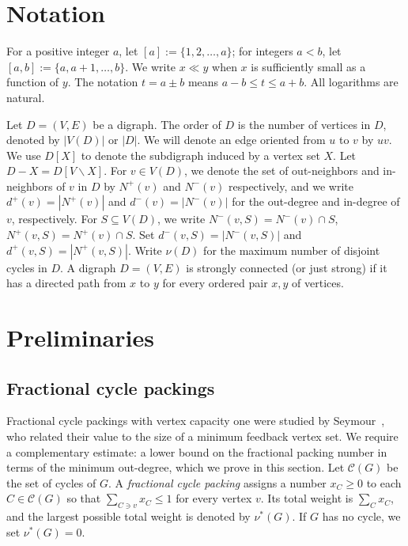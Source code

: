 \documentclass[10pt,a4paper]{article}
\numberwithin{equation}{section}
\begin{document}
\section{Notation}\label{sec:notation}


For a positive integer $a$, let $[a]:=\{1,2,\ldots,a\}$; for integers $a<b$, let $[a,b]:=\{a,a+1,\ldots,b\}$. We write $x\ll y$ when $x$ is sufficiently small as a function of $y$. The notation $t=a\pm b$ means $a-b\leq t\leq a+b$. All logarithms are natural.


Let $D=(V,E)$ be a digraph.  The order of $D$ is the number of vertices in $D$,  denoted by $|V(D)|$ or $|D|$.  We will denote an edge oriented from $u$ to $v$ by $uv$. We use $D[X]$ to denote the subdigraph induced by a vertex set $X$. Let $D-X = D[V\backslash X]$.  For $v\in V(D)$, we denote the set of out-neighbors and in-neighbors of $v$ in $D$ by $N^+(v)$ and $N^-(v)$ respectively, and we write $d^+(v)=|N^+(v)|$ and $d^-(v)=|N^-(v)|$ for the out-degree and in-degree of $v$, respectively. For $S\subseteq V(D)$, we write $N^-(v,S)=N^-(v)\cap S$, $N^+(v,S)=N^+(v)\cap S$. Set $d^-(v,S)=|N^-(v,S)|$ and $d^+(v,S)=|N^+(v, S)|$.   %
Write $\nu(D)$ for the maximum number of disjoint cycles
in $D$. A digraph $D=(V,E)$ is strongly connected (or just strong) if it has a directed path from $x$ to $y$ for every ordered pair $x,y$ of vertices.


\section{Preliminaries}\label{sec:preliminaries}


\subsection{Fractional cycle packings}\label{subsec:fractional}


Fractional cycle packings with vertex capacity one were studied by
Seymour~\cite{seymourC15}, who related their value to the size of a minimum feedback
vertex set. We require a complementary estimate: a lower bound on the
fractional packing number in terms of the minimum out-degree, which we
prove in this section.
Let $\mathcal C(G)$ be the set of cycles of $G$.
A \emph{fractional cycle packing} assigns a number $x_C\ge0$ to
each $C\in\mathcal C(G)$ so that
$\sum_{C\ni v}x_C\le1$ for every vertex $v$. Its total weight is
$\sum_C x_C$, and the largest possible total weight is denoted by
$\nu^\ast(G)$. If $G$ has no cycle, we set $\nu^\ast(G)=0$.  
\end{document}
